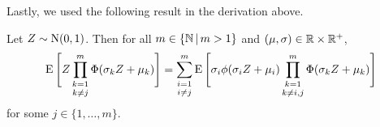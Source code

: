 %
%

Lastly, we used the following result in the derivation above.
\begin{lemma}\label{lem:EZgZ}
  Let $Z \sim \operatorname{N}(0,1)$. Then for all $m \in \{\mathbb{N} \, | \, m > 1\}$ and $(\mu, \sigma) \in \mathbb{R} \times \mathbb{R}^+$, 
  \[
    \operatorname{E} \Bigg[ Z \mathop{\prod_{k=1}^m}_{k \neq j} \Phi(\sigma_k Z + \mu_k) \Bigg]
    = \mathop{\sum_{i=1}^m}_{i \neq j} \operatorname{E} \Bigg[ \sigma_i \phi(\sigma_i Z + \mu_i) \mathop{\prod_{k=1}^m}_{k \neq i,j} \Phi (\sigma_k Z + \mu_k) \Bigg]
  \]
  for some $j \in \{1, \dots, m\}$.
\end{lemma}


